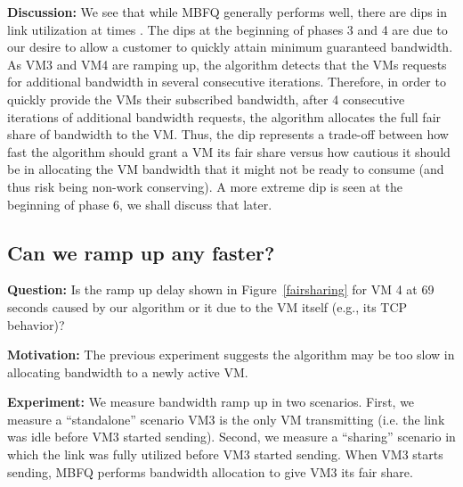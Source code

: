 {\bf Discussion:} We see that while MBFQ generally performs well, there are dips
in link utilization at times . The dips at the beginning of phases 3
and 4 are due to our desire to allow a customer to quickly attain minimum
guaranteed bandwidth. As VM3 and VM4 are ramping up, the algorithm detects that
the VMs requests for additional bandwidth in several consecutive iterations.
Therefore, in order to quickly provide the VMs their subscribed bandwidth, after
4 consecutive iterations of additional bandwidth requests, the algorithm
allocates the full fair share of bandwidth to the VM.  Thus, the dip represents a trade-off between how fast the
algorithm should grant a VM its fair share versus how cautious it should be in
allocating the VM bandwidth that it might not be ready to consume (and thus risk
being non-work conserving). A more extreme dip is seen at the
beginning of phase 6, we shall discuss that later.

\subsection{Can we ramp up any faster?}

{\bf Question:}  Is the ramp up delay shown in Figure~\ref{fairsharing} for VM 4
at 69 seconds caused by our algorithm or it due to the VM itself (e.g., its TCP
behavior)?

{\bf Motivation:} The previous experiment suggests the algorithm may be too slow
in allocating bandwidth to a newly active VM.  

{\bf Experiment:} We measure bandwidth ramp up in two scenarios.  First, we
measure a  ``standalone'' scenario VM3 is the only VM transmitting (i.e. the link
was idle before VM3 started sending).  Second, we measure a  ``sharing'' scenario
in which the link was fully utilized before VM3 started sending. When VM3 starts
sending, MBFQ performs bandwidth allocation to give VM3 its fair share.

